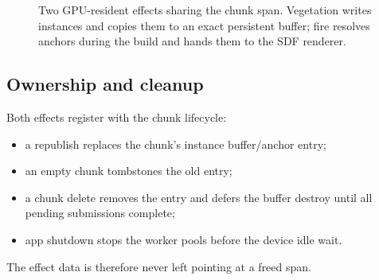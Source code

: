 \begin{figure}[htbp]
\centering
{}
\caption{Two GPU-resident effects sharing the chunk span.  Vegetation
writes instances and copies them to an exact persistent buffer; fire
resolves anchors during the build and hands them to the SDF renderer.}
\label{fig:effects}
\end{figure}

\subsection{Ownership and cleanup}

Both effects register with the chunk lifecycle:
\begin{itemize}
\item a republish replaces the chunk's instance buffer/anchor entry;
\item an empty chunk tombstones the old entry;
\item a chunk delete removes the entry and defers the buffer destroy until
  all pending submissions complete;
\item app shutdown stops the worker pools before the device idle wait.
\end{itemize}
The effect data is therefore never left pointing at a freed span.
